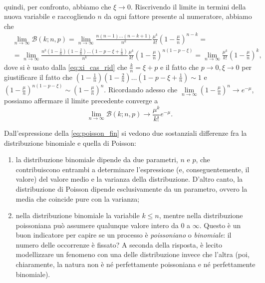 \documentclass{report}
\begin{document}
\begin{myproof}
\begin{align*}
\end{align*}
quindi, per confronto, abbiamo che $\xi \to 0$. Riscrivendo il limite in termini della nuova variabile e raccogliendo $n$ da ogni fattore presente al numeratore, abbiamo che
\begin{align*}
	&\lim_{n \to \infty} \mathcal{B}(k; n, p) = \lim_{n \to \infty} \frac{n(n-1)\ldots (n-k+1)}{n^k} \frac{\mu^k}{k!}(1 - \frac{\mu}{n})^{n-k} = \\
	&= \lim_{n \to \infty} \frac{n^k(1 - \frac{1}{n})(1 - \frac{2}{n}) \ldots (1 - p - \xi + \frac{1}{n})}{n^k} \frac{\mu^k}{k!} \left(1 - \frac{\mu}{n} \right)^{n(1 - p - \xi)} = \lim_{n \to \infty} \frac{\mu^k}{k!} (1 - \frac{\mu}{n})^k,
\end{align*}
dove si è usato dalla \ref{eq:xi_cas_rid} che $\frac{k}{n} = \xi + p$ e il fatto che $p \to 0, \xi \to 0$ per giustificare il fatto che $(1 - \frac{1}{n})(1 - \frac{2}{n}) \ldots (1 - p - \xi + \frac{1}{n}) \sim 1$ e $(1 -\frac{\mu}{n})^{n(1 - p - \xi)} \sim (1 - \frac{\mu}{n})^{n}$. Ricordando adesso che $\lim\limits_{n \to \infty} (1 - \frac{\mu}{n})^n \to e^{-\mu}$, possiamo affermare il limite precedente converge a
\begin{equation}
	\lim_{n \to \infty} \mathcal{B}(k; n, p) \to \frac{\mu^k}{k!} e^{-\mu}.
\end{equation}
\end{myproof}
Dall'espressione della \ref{eq:poisson_fin} si vedono due sostanziali differenze fra la distribuzione binomiale e quella di Poisson:
\begin{enumerate}[label=\protect\circled{\arabic*}]
	\item la distribuzione binomiale dipende da due parametri, $n$ e $p$, che contribuiscono entrambi a determinare l'espressione (e, conseguentemente, il valore) del valore medio e la varianza della distribuzione. D'altro canto, la distribuzione di Poisson dipende esclusivamente da un parametro, ovvero la media che coincide pure con la varianza;
	\item nella distribuzione binomiale la variabile $k \leq n$, mentre nella distribuzione poissoniana può assumere qualunque valore intero da $0$ a $\infty$. Questo è un buon indicatore per capire se un processo è \emph{poissoniano} o \emph{binomiale}: il numero delle occorrenze è fissato? A seconda della risposta, è lecito modellizzare un fenomeno con una delle distribuzione invece che l'altra (poi, chiaramente, la natura non è né perfettamente poissoniana e né perfettamente binomiale).
\end{enumerate}
\end{document}
